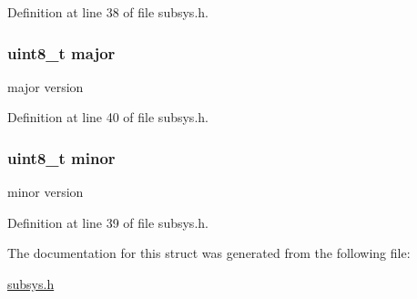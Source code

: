 Definition at line 38 of file subsys.\+h.

\hypertarget{structversion__mmb__t_a5bd4e4c943762926c8f653b6224cced2}{}
\subsubsection[{major}]{\setlength{\rightskip}{0pt plus 5cm}uint8\+\_\+t major}\label{structversion__mmb__t_a5bd4e4c943762926c8f653b6224cced2}
major version 

Definition at line 40 of file subsys.\+h.

\hypertarget{structversion__mmb__t_ae2f416b0a34b7beb4ed3873d791ac393}{}
\subsubsection[{minor}]{\setlength{\rightskip}{0pt plus 5cm}uint8\+\_\+t minor}\label{structversion__mmb__t_ae2f416b0a34b7beb4ed3873d791ac393}
minor version 

Definition at line 39 of file subsys.\+h.



The documentation for this struct was generated from the following file\+:\begin{DoxyCompactItemize}
\item 
\hyperlink{subsys_8h}{subsys.\+h}\end{DoxyCompactItemize}
